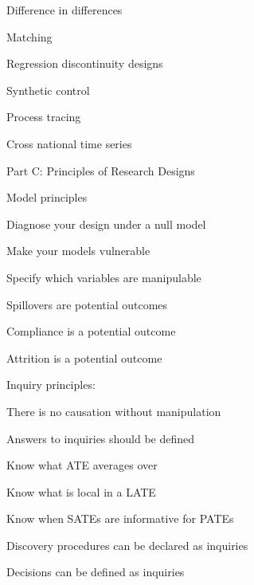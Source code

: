 \documentclass[11pt]{article}
\begin{document}
\begin{legal}
\begin{legal}
		\begin{legal}
		\item   Difference in differences
		\item 	Matching
		\item 	Regression discontinuity designs
		\item 	Synthetic control
		\item 	Process tracing
		\item 	Cross national time series
		\end{legal}
	\end{legal}

\item Part C: Principles of Research Designs
	
	\vspace{-2mm} %
	
	\begin{legal}
	\item Model principles
	
		\begin{legal}
		\item 	Diagnose your design under a null model 
		\item 	Make your models vulnerable 
		\item 	Specify which variables are manipulable
		\item 	Spillovers are potential outcomes
		\item 	Compliance is a potential outcome
		\item 	Attrition is a potential outcome
		\end{legal}
		
	\item Inquiry principles:
		
		\begin{legal}
					
		\item	There is no causation without manipulation
		\item	Answers to inquiries should be defined 
		\item	Know what ATE averages over
		\item	Know what is local in a LATE 
		\item	Know when SATEs are informative for PATEs
		\item	Discovery procedures can be declared as inquiries
		\item	Decisions can be defined as inquiries 
		\end{legal}
				

\end{legal}
\end{legal}
\end{document}
